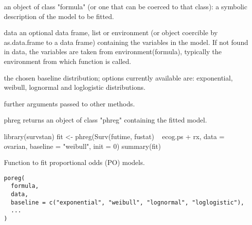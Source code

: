 \documentclass[letterpaper]{book}
\begin{document}
\begin{Arguments}
\begin{ldescription}
\item[\code{formula}] an object of class "formula" (or one that can be coerced to that class): a symbolic description of the model to be fitted.

\item[\code{data}] data an optional data frame, list or environment (or object coercible by as.data.frame to a data frame) containing the variables in the model. If not found in data, the variables are taken from environment(formula), typically the environment from which function is called.

\item[\code{baseline}] the chosen baseline distribution; options currently available are: exponential, weibull, lognormal and loglogistic distributions.

\item[\code{...}] further arguments passed to other methods.
\end{ldescription}
\end{Arguments}
%
\begin{Value}
phreg returns an object of class "phreg" containing the fitted model.
\end{Value}
%
\begin{Examples}
\begin{ExampleCode}

library(survstan)
fit <- phreg(Surv(futime, fustat) ~ ecog.ps + rx, data = ovarian, baseline = "weibull", init = 0)
summary(fit)



\end{ExampleCode}
\end{Examples}
%
\begin{Description}\relax
Function to fit proportional odds (PO) models.
\end{Description}
%
\begin{Usage}
\begin{verbatim}
poreg(
  formula,
  data,
  baseline = c("exponential", "weibull", "lognormal", "loglogistic"),
  ...
)
\end{verbatim}
\end{Usage}
%
\end{document}
